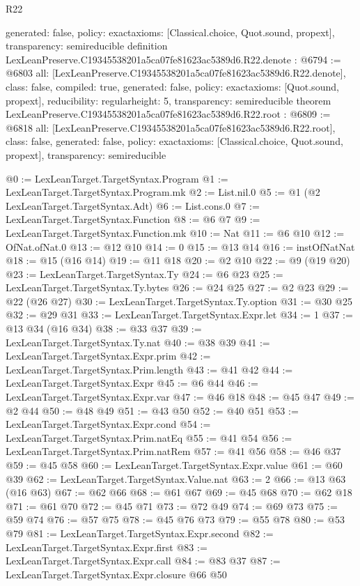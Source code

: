 \begin{lexlean}{R22}
\begin{coremodule}
{  generated: false,
  policy: exact{axioms: [Classical.choice, Quot.sound, propext]},
  transparency: semireducible
}
definition LexLeanPreserve.C19345538201a5ca07fe81623ac5389d6.R22.denote : @6794 := @6803 {
  all: [LexLeanPreserve.C19345538201a5ca07fe81623ac5389d6.R22.denote],
  class: false,
  compiled: true,
  generated: false,
  policy: exact{axioms: [Quot.sound, propext]},
  reducibility: regular{height: 5},
  transparency: semireducible
}
theorem LexLeanPreserve.C19345538201a5ca07fe81623ac5389d6.R22.root : @6809 := @6818 {
  all: [LexLeanPreserve.C19345538201a5ca07fe81623ac5389d6.R22.root],
  class: false,
  generated: false,
  policy: exact{axioms: [Classical.choice, Quot.sound, propext]},
  transparency: semireducible
}

@0 := LexLeanTarget.TargetSyntax.Program
@1 := LexLeanTarget.TargetSyntax.Program.mk
@2 := List.nil.{0}
@5 := @1 (@2 LexLeanTarget.TargetSyntax.Adt)
@6 := List.cons.{0}
@7 := LexLeanTarget.TargetSyntax.Function
@8 := @6 @7
@9 := LexLeanTarget.TargetSyntax.Function.mk
@10 := Nat
@11 := @6 @10
@12 := OfNat.ofNat.{0}
@13 := @12 @10
@14 := 0
@15 := @13 @14
@16 := instOfNatNat
@18 := @15 (@16 @14)
@19 := @11 @18
@20 := @2 @10
@22 := @9 (@19 @20)
@23 := LexLeanTarget.TargetSyntax.Ty
@24 := @6 @23
@25 := LexLeanTarget.TargetSyntax.Ty.bytes
@26 := @24 @25
@27 := @2 @23
@29 := @22 (@26 @27)
@30 := LexLeanTarget.TargetSyntax.Ty.option
@31 := @30 @25
@32 := @29 @31
@33 := LexLeanTarget.TargetSyntax.Expr.let
@34 := 1
@37 := @13 @34 (@16 @34)
@38 := @33 @37
@39 := LexLeanTarget.TargetSyntax.Ty.nat
@40 := @38 @39
@41 := LexLeanTarget.TargetSyntax.Expr.prim
@42 := LexLeanTarget.TargetSyntax.Prim.length
@43 := @41 @42
@44 := LexLeanTarget.TargetSyntax.Expr
@45 := @6 @44
@46 := LexLeanTarget.TargetSyntax.Expr.var
@47 := @46 @18
@48 := @45 @47
@49 := @2 @44
@50 := @48 @49
@51 := @43 @50
@52 := @40 @51
@53 := LexLeanTarget.TargetSyntax.Expr.cond
@54 := LexLeanTarget.TargetSyntax.Prim.natEq
@55 := @41 @54
@56 := LexLeanTarget.TargetSyntax.Prim.natRem
@57 := @41 @56
@58 := @46 @37
@59 := @45 @58
@60 := LexLeanTarget.TargetSyntax.Expr.value
@61 := @60 @39
@62 := LexLeanTarget.TargetSyntax.Value.nat
@63 := 2
@66 := @13 @63 (@16 @63)
@67 := @62 @66
@68 := @61 @67
@69 := @45 @68
@70 := @62 @18
@71 := @61 @70
@72 := @45 @71
@73 := @72 @49
@74 := @69 @73
@75 := @59 @74
@76 := @57 @75
@78 := @45 @76 @73
@79 := @55 @78
@80 := @53 @79
@81 := LexLeanTarget.TargetSyntax.Expr.second
@82 := LexLeanTarget.TargetSyntax.Expr.first
@83 := LexLeanTarget.TargetSyntax.Expr.call
@84 := @83 @37
@87 := LexLeanTarget.TargetSyntax.Expr.closure @66 @50

\end{coremodule}
\end{lexlean}

